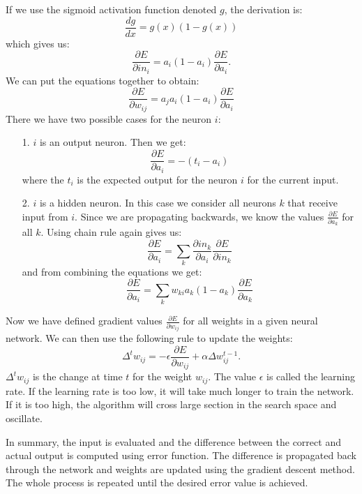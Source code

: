 If we use the sigmoid activation function denoted $g$, the derivation is:
\begin{equation*}
\frac{dg}{dx}  =  g(x)(1-g(x))
\end{equation*}
which gives us:
\begin{equation*}
\frac{\partial E}{\partial in_{i}} = a_{i}(1-a_{i}) \frac{\partial E}{\partial a_{i}}.
\end{equation*}
We can put the equations together to obtain:
\begin{equation*}
\frac{\partial E}{\partial w_{ij}} = a_{j} a_{i}(1-a_{i}) \frac{\partial E}{\partial a_{i}}
\end{equation*}
There we have two possible cases for the neuron $i$:
\begin{enumerate}
\item [1.] $i$ is an output neuron. Then we get: 
	\[
	\frac{\partial E}{\partial a_{i}} = -(t_{i} - a_{i})
	\]
	where the $t_{i}$ is the expected output for the neuron $i$ for the current input.

\item [2.] $i$ is a hidden neuron. In this case we consider all neurons $k$ that receive input from $i$. Since we are propagating backwards, we know the values $\frac{\partial E}{\partial a_{k}}$ for all $k$. Using chain rule again gives us:
	\[
	\frac{\partial E}{\partial a_{i}} = \sum_{k} \frac{\partial in_{k}}{\partial a_{i}} \frac{\partial E}{\partial in_{k}}
	\]
and from combining the equations we get:
	\[
	\frac{\partial E}{\partial a_{i}} = \sum_{k} w_{ki}a_{k}(1-a_{k}) \frac{\partial E}{\partial a_{k}}
	\]
\end{enumerate}
Now we have defined gradient values $\frac{\partial E}{\partial w_{ij}}$ for all weights in a given neural network.
We can then use the following rule to update the weights:
\[
\Delta^{t} w_{ij} = - \epsilon \frac {\partial E}{\partial w_{ij}} + \alpha \Delta w^{t-1}_{ij}.
\]
$\Delta^{t} w_{ij}$ is the change at time $t$ for the weight $w_{ij}$. The value $\epsilon$ is called the learning rate. If the learning rate is too low, it will take much longer to train the network. If it is too high, the algorithm will cross large section in the search space and  oscillate.

In summary, the input is evaluated and the difference between the correct and actual output is computed using error function. The difference is propagated back through the network and weights are updated using the gradient descent method. The whole process is repeated until the desired error value is achieved.

